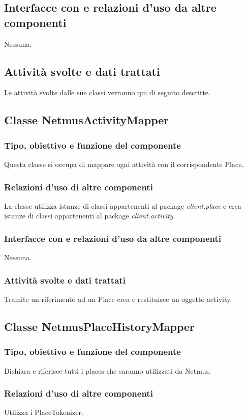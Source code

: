 \subsection*{Interfacce con e relazioni d'uso da altre componenti}
Nessuna.
\subsection*{Attivit\`a svolte e dati trattati}
Le attivit\`a svolte dalle sue classi verranno qui di seguito descritte.

\subsection{Classe NetmusActivityMapper}
\subsubsection*{Tipo, obiettivo e funzione del componente}
Questa classe si occupa di mappare ogni attivit\`a con il corrispondente Place.
\subsubsection*{Relazioni d'uso di altre componenti}
La classe utilizza istanze di classi appartenenti al package
\emph{client.place} e crea istanze di classi appartenenti al package
\emph{client.activity}.
\subsubsection*{Interfacce con e relazioni d'uso da altre
componenti} Nessuna.
\subsubsection*{Attivit\`a svolte e dati trattati}
Tramite un riferimento ad un Place crea e restituisce un oggetto activity.

\subsection{Classe NetmusPlaceHistoryMapper}
\subsubsection*{Tipo, obiettivo e funzione del componente}
Dichiara e riferisce tutti i places che saranno utilizzati da Netmus.
\subsubsection*{Relazioni d'uso di altre componenti}
Utilizza i PlaceTokenizer.
